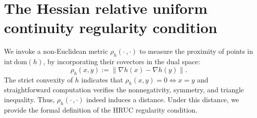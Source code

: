 \documentclass{article}
\theoremstyle{plain}
\theoremstyle{definition}
\theoremstyle{remark}
\newcommand{\idom}[1]{\mathrm{int\ dom}(#1)}
\begin{document}
\section{The Hessian relative uniform continuity regularity condition}  We invoke a non-Euclidean metric $\rho_h(\cdot\,,\cdot)$ to measure the proximity of points in $\idom{h}$, by incorporating their covectors in the dual space:
\begin{equation*} \rho_h(x,y):=\|\nabla h(x)-\nabla h(y)\|. \end{equation*}
The strict convexity of $h$ indicates that $\rho_h(x,y)=0\Leftrightarrow x=y$ and straightforward computation verifies the nonnegativity, symmetry, and triangle inequality. Thus, $\rho_h(\cdot\,,\cdot)$ indeed induces a distance. Under this distance, we provide the formal definition of the HRUC regularity condition. 
\end{document}

